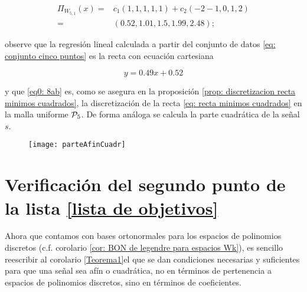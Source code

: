\begin{ejemplo}
\begin{align}
\label{eq0: 8ab}
\Pi_{W_{5,1}}(x) =& c_{1} (1,1,1,1,1) + c_{2}(-2-1,0,1,2) \nonumber \\
= & (0.52, 1.01, 1.5, 1.99, 2.48 );
\end{align}

observe que 
la regresión lineal calculada a partir
del conjunto de datos
\eqref{eq: conjunto cinco puntos}
es la recta
con ecuación cartesiana

\begin{equation} \label{eq: recta minimos cuadrados}
y=0.49x+0.52
\end{equation}

y que \eqref{eq0: 8ab} es, 
como se asegura en la proposición
\ref{prop: discretizacion recta minimos cuadrados}, la discretización de 
la recta \eqref{eq: recta minimos cuadrados}
en la malla uniforme $\mathcal{P}_{5}$.
De forma análoga se calcula la parte cuadrática de
la señal $s$.

\begin{figure}[H]
	\centering
	\texttt{[image: parteAfinCuadr]}
\end{figure}	
\final
\end{ejemplo}


\section{Verificación del segundo punto de la lista \ref{lista de objetivos}}
\label{Caracterización de la morfología en términos de coeficientes respecto a la base de Legendre discreta}

Ahora que contamos con bases ortonormales
para los espacios de polinomios discretos
(c.f. corolario \ref{cor: BON de legendre para espacios Wk}),
es sencillo reescribir al corolario
\ref{Teorema1}el que se dan condiciones necesarias y suficientes para que
una señal sea afín o cuadrática,
no en términos de pertenencia a espacios de polinomios
discretos,
sino en términos de coeficientes.


